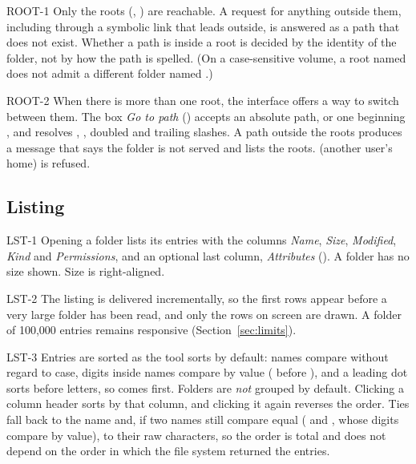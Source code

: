 \begin{req}{ROOT-1}
Only the roots (, ) are reachable.  A request for anything
outside them, including through a symbolic link that leads outside, is answered as a
path that does not exist.  Whether a path is inside a root is decided by the
identity of the folder, not by how the path is spelled.  (On a case-sensitive
volume, a root named  does not admit a different folder named
.)
\end{req}

\begin{req}{ROOT-2}
When there is more than one root, the interface offers a way to switch between
them.  The box \emph{Go to path} () accepts an absolute path, or one
beginning \code{\~{}/}, and resolves , , doubled and trailing
slashes.  A path outside the roots produces a message that says the folder is not
served and lists the roots.   (another user's home) is refused.
\end{req}

\subsection{Listing}

\begin{req}{LST-1}
Opening a folder lists its entries with the columns \emph{Name}, \emph{Size},
\emph{Modified}, \emph{Kind} and \emph{Permissions}, and an optional last column,
\emph{Attributes} ().  A folder has no size shown.  Size is right-aligned.
\end{req}

\begin{req}{LST-2}
The listing is delivered incrementally, so the first rows appear before a very
large folder has been read, and only the rows on screen are drawn.  A folder of
100{,}000 entries remains responsive (Section~\ref{sec:limits}).
\end{req}

\begin{req}{LST-3}
Entries are sorted as the tool  sorts by default: names compare without
regard to case, digits inside names compare by value ( before
), and a leading dot sorts before letters, so  comes
first.  Folders are \emph{not} grouped by default.  Clicking a column header sorts
by that column, and clicking it again reverses the order.  Ties fall back to the
name and, if two names still compare equal ( and , whose
digits compare by value), to their raw characters, so the order is total and does
not depend on the order in which the file system returned the entries.
\end{req}

